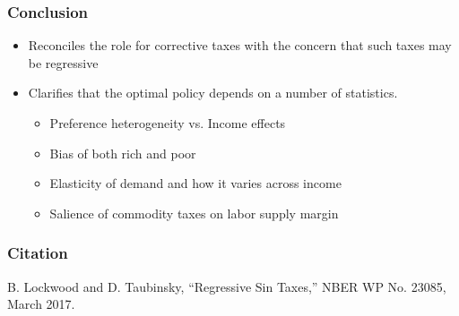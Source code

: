 \documentclass{beamer}
\begin{document}
\begin{frame}
\frametitle{Conclusion} 

\begin{itemize}
	\item Reconciles the role for corrective taxes with the concern that such taxes may be regressive
	\item Clarifies that the optimal policy depends on a number of statistics. 
	\begin{itemize}
		\item Preference heterogeneity vs. Income effects 
		\item Bias of both rich and poor 
		\item Elasticity of demand and how it varies across income
		\item Salience of commodity taxes on labor supply margin 
	\end{itemize}

\end{itemize}

\end{frame}
	
	
	\begin{frame}
	\frametitle{Citation} 
	
	B. Lockwood and D. Taubinsky, “Regressive Sin Taxes,” NBER WP No. 23085, March 2017.
	
	\end{frame}
	
	
\end{document}
